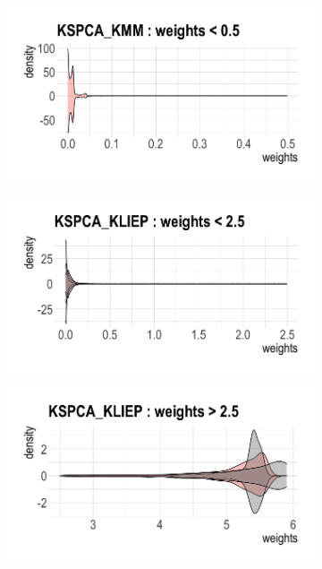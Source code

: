 \documentclass[a4paper,12pt]{article}
\begin{document}
\begin{figure}[H]
\begin{subfigure}{.32\textwidth}
  \label{fig:sfig2}
\end{subfigure} 
\begin{subfigure}{.32\textwidth}
  \centering
  \includegraphics[width=\linewidth]{bio11.png}
  \label{fig:sfig2}
\end{subfigure} %
\begin{subfigure}{.32\textwidth}
  \centering
  \includegraphics[width=\linewidth]{bio14.png}
  \label{fig:sfig1}
\end{subfigure}%
\begin{subfigure}{.32\textwidth}
  \centering
  \includegraphics[width=\linewidth]{bio15.png}

\end{subfigure}
\end{figure}
\end{document}
